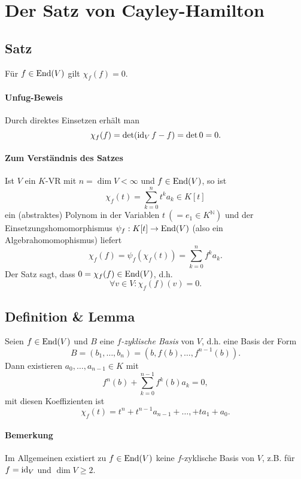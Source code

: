 \section{Der Satz von Cayley-Hamilton}
\subsection{Satz}
	Für $ f\in\operatorname{End}(V) $ gilt $ \chi_f(f) = 0$.
\paragraph{Unfug-Beweis}
	Durch direktes Einsetzen erhält man
		\[ \chi_f(f)=\det (\operatorname{id}_V f-f) = \det 0 = 0. \]
\paragraph{Zum Verständnis des Satzes}
	Ist $ V $ ein $ K $-VR mit $ n=\dim V < \infty $ und $ f\in \operatorname{End} (V) $, so ist
		\[ \chi_f(t) = \sum_{k=0}^{n}t^ka_k \in K[t] \]
	ein (abstraktes) Polynom in der Variablen $ t\ (= e_1\in K^\mathbb{N})$ und der Einsetzungshomomorphismus $ \psi_f:K[t]\to \operatorname{End}(V) $ (also ein Algebrahomomophismus) liefert
		\[ \chi_f(f) = \psi_f\left(\chi_f(t)\right) = \sum_{k=0}^{n}f^k a_k. \]
	Der Satz sagt, dass $ 0 = \chi_f(f)\in \operatorname{End}(V) $, d.h.
		\[ \forall v\in V: \chi_f(f)(v) = 0. \]
\subsection{Definition \& Lemma}
	Seien $ f\in\operatorname{End}(V) $ und $ B $ eine \emph{$ f $-zyklische Basis} von $ V $, d.h. eine Basis der Form
		\[ B= (b_1,\dots,b_n) = \left(b,f(b),\dots,f^{n-1}(b)\right). \]
	Dann existieren $ a_0,\dots,a_{n-1}\in K $ mit
		\[ f^n(b)+\sum_{k=0}^{n-1}f^k(b)a_k = 0, \]
	mit diesen Koeffizienten ist
		\[ \chi_f(t) = t^n+t^{n-1}a_{n-1}+\dots,+ta_1+a_0. \]
\paragraph{Bemerkung}
	Im Allgemeinen existiert zu $ f\in \operatorname{End}(V) $ keine $ f $-zyklische Basis von $ V $, z.B. für $ f = \operatorname{id}_V $ und $ \dim V \geq 2 $.
